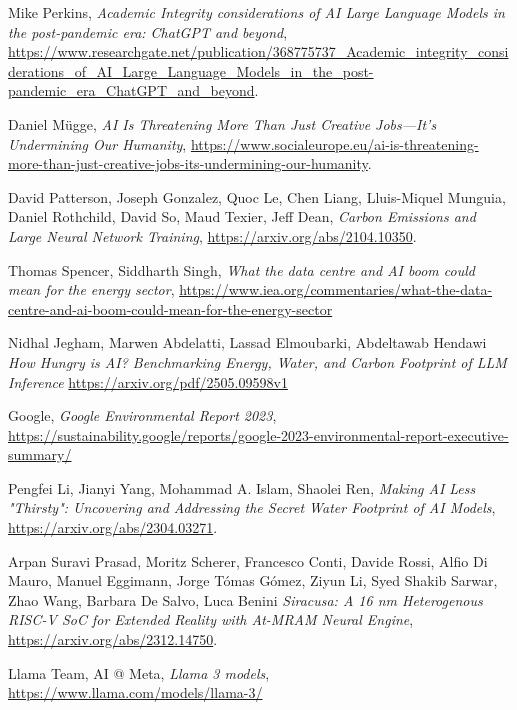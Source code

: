\begin{thebibliography}{9}

	Mike Perkins,
	\textit{Academic Integrity considerations of AI Large Language Models in the post-pandemic era: ChatGPT and beyond},
	\url{https://www.researchgate.net/publication/368775737_Academic_integrity_considerations_of_AI_Large_Language_Models_in_the_post-pandemic_era_ChatGPT_and_beyond}.

	Daniel Mügge,
	\textit{AI Is Threatening More Than Just Creative Jobs—It’s Undermining Our Humanity},
	\url{https://www.socialeurope.eu/ai-is-threatening-more-than-just-creative-jobs-its-undermining-our-humanity}.

	David Patterson, Joseph Gonzalez, Quoc Le, Chen Liang, Lluis-Miquel Munguia, Daniel Rothchild, David So, Maud Texier, Jeff Dean,
	\textit{Carbon Emissions and Large Neural Network Training},
	\url{https://arxiv.org/abs/2104.10350}.

	Thomas Spencer, Siddharth Singh,
	\textit{What the data centre and AI boom could mean for the energy sector},
	\url{https://www.iea.org/commentaries/what-the-data-centre-and-ai-boom-could-mean-for-the-energy-sector}

	Nidhal Jegham, Marwen Abdelatti, Lassad Elmoubarki, Abdeltawab Hendawi
	\textit{How Hungry is AI? Benchmarking Energy, Water, and Carbon Footprint of LLM Inference}
	\url{https://arxiv.org/pdf/2505.09598v1}

	Google,
	\textit{Google Environmental Report 2023},
	\url{https://sustainability.google/reports/google-2023-environmental-report-executive-summary/}

	Pengfei Li, Jianyi Yang, Mohammad A. Islam, Shaolei Ren,
	\textit{Making AI Less "Thirsty": Uncovering and Addressing the Secret Water Footprint of AI Models},
	\url{https://arxiv.org/abs/2304.03271}.

	Arpan Suravi Prasad, Moritz Scherer, Francesco Conti, Davide Rossi, Alfio Di Mauro, Manuel Eggimann, Jorge Tómas Gómez, Ziyun Li, Syed Shakib Sarwar, Zhao Wang, Barbara De Salvo, Luca Benini
	\textit{Siracusa: A 16 nm Heterogenous RISC-V SoC for Extended Reality with At-MRAM Neural Engine},
	\url{https://arxiv.org/abs/2312.14750}.

	Llama Team, AI @ Meta,
	\textit{Llama 3 models},
	\url{https://www.llama.com/models/llama-3/}


\end{thebibliography}
